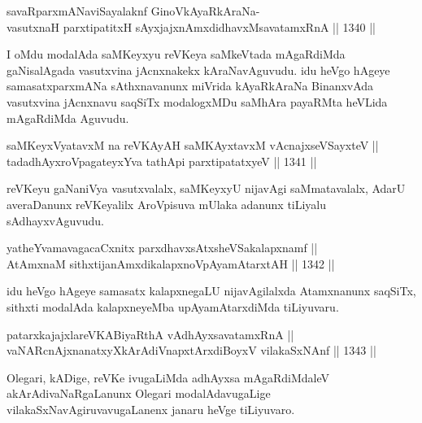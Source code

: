 \begin{shl}
savaRparxmANaviSayalaknf GinoV\s kAyaRkAraNa-\\
vasutxnaH parxtipatitxH sAyxjajxnAmxdidhavxMsavatamxRnA \hfill || 1340 ||  
\end{shl}

\begin{artha}
I oMdu modalAda saMKeyxyu reVKeya saMkeVtada mAgaRdiMda gaNisalAgada vasutxvina jAcnxnakekx kAraNavAguvudu. idu heVgo hAgeye samasatxparxmANa sAthxnavanunx miVrida kAyaRkAraNa BinanxvAda vasutxvina jAcnxnavu saqSiTx modalogxMDu saMhAra payaRMta heVLida mAgaRdiMda Aguvudu.
\end{artha}


\begin{shl}
saMKeyxVyatavxM na reVKAyAH saMKAyxtavxM vA\s cnajxseVSayxteV  || \\
tadadhAyxroVpagateyxYva tathA\s pi parxtipatatxyeV \hfill || 1341 ||  
\end{shl}

\begin{artha}
reVKeyu gaNaniVya vasutxvalalx, saMKeyxyU nijavAgi saMmatavalalx, AdarU averaDanunx reVKeyalilx AroVpisuva mUlaka adanunx tiLiyalu sAdhayxvAguvudu.
\end{artha}

\begin{shl}
yatheYvamavagacaCxnitx parxdhavxsAtxsheVSakalapxnamf || \\
AtAmxnaM sithxtijanAmxdikalapxnoVpAyamAtarxtAH \hfill || 1342 ||  
\end{shl}

\begin{artha}
idu heVgo hAgeye samasatx kalapxnegaLU nijavAgilalxda Atamxnanunx saqSiTx, sithxti modalAda kalapxneyeMba upAyamAtarxdiMda tiLiyuvaru.
\end{artha}


\begin{shl}
patarxkajajxlareVKABiyaRthA vA\s dhAyxsavatamxRnA || \\
vaNARcnAjxnanatxyXkArAdiVnapxtArxdiBoyxV vilakaSxNAnf  \hfill || 1343 ||  
\end{shl}

\begin{artha}
Olegari, kADige, reVKe ivugaLiMda adhAyxsa mAgaRdiMdaleV akArAdivaNaRgaLanunx Olegari modalAdavugaLige vilakaSxNavAgiruvavugaLanenx janaru heVge tiLiyuvaro.
\end{artha}

